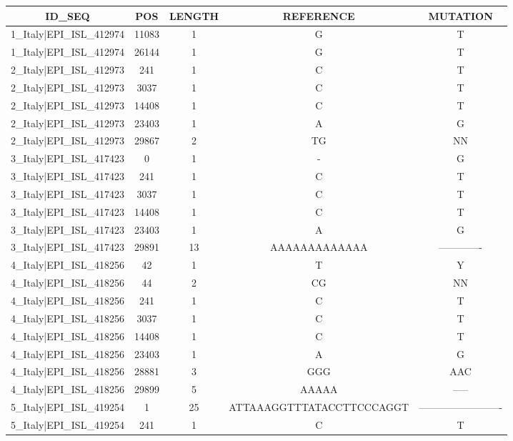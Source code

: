 \documentclass[a4paper,10pt]{article}
\begin{document}
\begin{longtable}{@{}ccccc@{}}


\toprule
\textbf{ID\_SEQ} & \textbf{POS} & \textbf{LENGTH} & \textbf{REFERENCE} & \textbf{MUTATION} \\* \midrule
\endfirsthead
%
\cline{1-5}
\endhead
%
1\_Italy|EPI\_ISL\_412974 & 11083 & 1 & G & T \\* \midrule
1\_Italy|EPI\_ISL\_412974 & 26144 & 1 & G & T \\* \midrule
2\_Italy|EPI\_ISL\_412973 & 241 & 1 & C & T \\* \midrule
2\_Italy|EPI\_ISL\_412973 & 3037 & 1 & C & T \\* \midrule
2\_Italy|EPI\_ISL\_412973 & 14408 & 1 & C & T \\* \midrule
2\_Italy|EPI\_ISL\_412973 & 23403 & 1 & A & G \\* \midrule
2\_Italy|EPI\_ISL\_412973 & 29867 & 2 & TG & NN \\* \midrule
3\_Italy|EPI\_ISL\_417423 & 0 & 1 & - & G \\* \midrule
3\_Italy|EPI\_ISL\_417423 & 241 & 1 & C & T \\* \midrule
3\_Italy|EPI\_ISL\_417423 & 3037 & 1 & C & T \\* \midrule
3\_Italy|EPI\_ISL\_417423 & 14408 & 1 & C & T \\* \midrule
3\_Italy|EPI\_ISL\_417423 & 23403 & 1 & A & G \\* \midrule
3\_Italy|EPI\_ISL\_417423 & 29891 & 13 & AAAAAAAAAAAAA & ------------- \\* \midrule
4\_Italy|EPI\_ISL\_418256 & 42 & 1 & T & Y \\* \midrule
4\_Italy|EPI\_ISL\_418256 & 44 & 2 & CG & NN \\* \midrule
4\_Italy|EPI\_ISL\_418256 & 241 & 1 & C & T \\* \midrule
4\_Italy|EPI\_ISL\_418256 & 3037 & 1 & C & T \\* \midrule
4\_Italy|EPI\_ISL\_418256 & 14408 & 1 & C & T \\* \midrule
4\_Italy|EPI\_ISL\_418256 & 23403 & 1 & A & G \\* \midrule
4\_Italy|EPI\_ISL\_418256 & 28881 & 3 & GGG & AAC \\* \midrule
4\_Italy|EPI\_ISL\_418256 & 29899 & 5 & AAAAA & ----- \\* \midrule
5\_Italy|EPI\_ISL\_419254 & 1 & 25 & ATTAAAGGTTTATACCTTCCCAGGT & ------------------------- \\* \midrule
5\_Italy|EPI\_ISL\_419254 & 241 & 1 & C & T \\* \midrule

\end{longtable}
\end{document}
